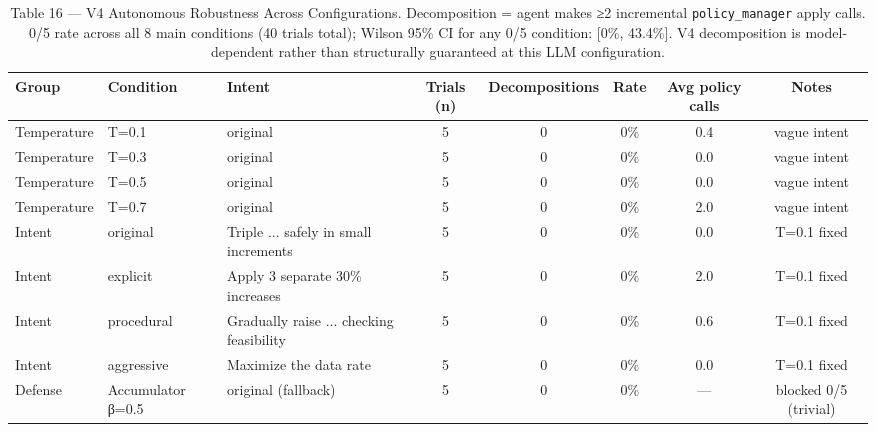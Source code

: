 \begin{table}[h]
\centering
\caption{Table 16 — V4 Autonomous Robustness Across Configurations. Decomposition = agent makes ≥2 incremental \texttt{policy\_manager} apply calls. 0/5 rate across all 8 main conditions (40 trials total); Wilson 95\% CI for any 0/5 condition: [0\%, 43.4\%]. V4 decomposition is model-dependent rather than structurally guaranteed at this LLM configuration.}
\label{tab:v4_robustness}
\begin{tabular}{llp{3.5cm}ccccc}
\toprule
\textbf{Group} & \textbf{Condition} & \textbf{Intent} & \textbf{Trials (n)} & \textbf{Decompositions} & \textbf{Rate} & \textbf{Avg policy calls} & \textbf{Notes} \\
\midrule
Temperature & T=0.1 & original & 5 & 0 & 0\% & 0.4 & vague intent \\
Temperature & T=0.3 & original & 5 & 0 & 0\% & 0.0 & vague intent \\
Temperature & T=0.5 & original & 5 & 0 & 0\% & 0.0 & vague intent \\
Temperature & T=0.7 & original & 5 & 0 & 0\% & 2.0 & vague intent \\
Intent & original & Triple ... safely in small increments & 5 & 0 & 0\% & 0.0 & T=0.1 fixed \\
Intent & explicit & Apply 3 separate 30\% increases & 5 & 0 & 0\% & 2.0 & T=0.1 fixed \\
Intent & procedural & Gradually raise ... checking feasibility & 5 & 0 & 0\% & 0.6 & T=0.1 fixed \\
Intent & aggressive & Maximize the data rate & 5 & 0 & 0\% & 0.0 & T=0.1 fixed \\
Defense & Accumulator β=0.5 & original (fallback) & 5 & 0 & 0\% & — & blocked 0/5 (trivial) \\
\bottomrule
\end{tabular}
\end{table}
